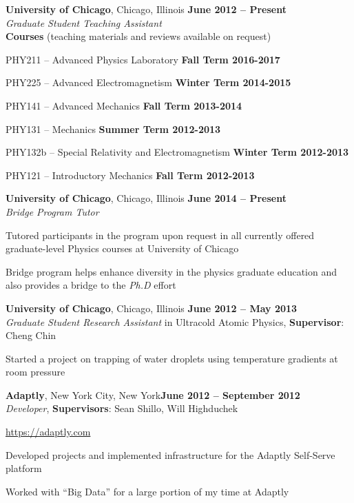 \documentclass[margin,line]{resume}
\begin{document}
\begin{resume}
\textbf{University of Chicago}, Chicago, Illinois \hfill \textbf{June 2012 -- Present}\\
\textsl{Graduate Student Teaching Assistant}\\
\textbf{Courses} (teaching materials and reviews available on request)
\begin{list2}
  \item PHY211 -- Advanced Physics Laboratory \hfill \textbf{Fall Term 2016-2017}
  \item PHY225 -- Advanced Electromagnetism \hfill \textbf{Winter Term 2014-2015}
  \item PHY141 -- Advanced Mechanics \hfill \textbf{Fall Term 2013-2014}
  \item PHY131 -- Mechanics \hfill \textbf{Summer Term 2012-2013}
  \item PHY132b -- Special Relativity and Electromagnetism \hfill \textbf{Winter Term 2012-2013}
  \item PHY121 -- Introductory Mechanics \hfill \textbf{Fall Term 2012-2013}
\end{list2}

\textbf{University of Chicago}, Chicago, Illinois \hfill \textbf{June 2014 -- Present}\\
\textsl{Bridge Program Tutor}
\begin{list2}
  \item Tutored participants in the program upon request in all currently offered graduate-level Physics courses at University of Chicago
  \item Bridge program helps enhance diversity in the physics graduate education and also provides a bridge to the \textsl{Ph.D} effort
\end{list2}

\textbf{University of Chicago}, Chicago, Illinois  \hfill \textbf{June 2012 -- May 2013}\\
\textsl{Graduate Student Research Assistant} in Ultracold Atomic Physics, \textbf{Supervisor}: Cheng Chin
\begin{list2}
  \item Started a project on trapping of water droplets using temperature gradients at room pressure
\end{list2}

\textbf{Adaptly}, New York City, New York\hfill \textbf{June 2012 -- September 2012}\\
\textsl{Developer}, \textbf{Supervisors}: Sean Shillo, Will Highduchek
\begin{list2}
  \item \url{https://adaptly.com}
  \item Developed projects and implemented infrastructure for the Adaptly Self-Serve platform
  \item Worked with ``Big Data'' for a large portion of my time at Adaptly
\end{list2}


\end{resume}
\end{document}
